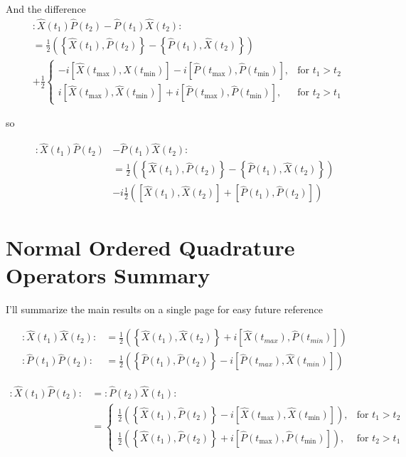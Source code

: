\documentclass[12pt]{article}
\begin{document}
And the difference
\begin{align}
&:\hat{X}(t_1)\hat{P}(t_2) - \hat{P}(t_1)\hat{X}(t_2):\\
&=\frac{1}{2} \left(\left\{\hat{X}(t_1),\hat{P}(t_2)\right\} - \left\{\hat{P}(t_1),\hat{X}(t_2)\right\}\right)\\
&+\frac{1}{2}\begin{cases}
-i\left[\hat{X}(t_{\text{max}}),\hat{X}(t_{\text{min}})\right] -i\left[\hat{P}(t_{\text{max}}),\hat{P}(t_{\text{min}})\right],& \text{for } t_1>t_2\\
i\left[\hat{X}(t_{\text{max}}),\hat{X}(t_{\text{min}})\right] +i\left[\hat{P}(t_{\text{max}}),\hat{P}(t_{\text{min}})\right],& \text{for } t_2>t_1
\end{cases}
\end{align}

so

\begin{align}
:\hat{X}(t_1)\hat{P}(t_2) &- \hat{P}(t_1)\hat{X}(t_2):\\
&= \frac{1}{2} \left(\left\{\hat{X}(t_1),\hat{P}(t_2)\right\} - \left\{\hat{P}(t_1),\hat{X}(t_2)\right\}\right)\\
&-i\frac{1}{2}\left(\left[\hat{X}(t_1),\hat{X}(t_2)\right] +\left[\hat{P}(t_1),\hat{P}(t_2)\right]\right)
\end{align}

\clearpage

\section{Normal Ordered Quadrature Operators Summary}
I'll summarize the main results on a single page for easy future reference

\begin{align}
:\hat{X}(t_1)\hat{X}(t_2): &= \frac{1}{2}\left(\left\{\hat{X}(t_1),\hat{X}(t_2)\right\} + i \left[\hat{X}(t_{max}),\hat{P}(t_{min})\right]\right)\\
:\hat{P}(t_1)\hat{P}(t_2): &= \frac{1}{2}\left(\left\{\hat{P}(t_1),\hat{P}(t_2)\right\} - i \left[\hat{P}(t_{max}),\hat{X}(t_{min})\right]\right)
\end{align}

\begin{align}
:\hat{X}(t_1)\hat{P}(t_2): &= :\hat{P}(t_2)\hat{X}(t_1):\\
&= 
\begin{cases}
\frac{1}{2}\left(\left\{\hat{X}(t_1),\hat{P}(t_2)\right\} - i \left[\hat{X}(t_{\text{max}}),\hat{X}(t_{\text{min}})\right]\right), &\text{for } t_1>t_2\\
\frac{1}{2}\left(\left\{\hat{X}(t_1),\hat{P}(t_2)\right\} + i \left[\hat{P}(t_{\text{max}}),\hat{P}(t_{\text{min}})\right]\right), &\text{for } t_2>t_1
\end{cases}
\end{align}
\end{document}
